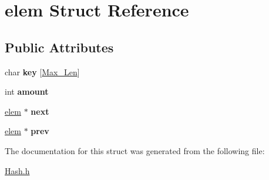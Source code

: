 \hypertarget{structelem}{\section{elem Struct Reference}
\label{structelem}
}
\subsection*{Public Attributes}
\begin{DoxyCompactItemize}
\item 
\hypertarget{structelem_a7f9840c852384016883d25531fb91973}{char {\bfseries key} \mbox{[}\hyperlink{Hash_8h_af086ed3f61750a30d9f6f5a397e0edc0}{Max\-\_\-\-Len}\mbox{]}}\label{structelem_a7f9840c852384016883d25531fb91973}

\item 
\hypertarget{structelem_a516926f6d3843f4c39d0c974786d5302}{int {\bfseries amount}}\label{structelem_a516926f6d3843f4c39d0c974786d5302}

\item 
\hypertarget{structelem_a13d0e216257db6754fbee2af9829170c}{\hyperlink{structelem}{elem} $\ast$ {\bfseries next}}\label{structelem_a13d0e216257db6754fbee2af9829170c}

\item 
\hypertarget{structelem_a9d914201f1b505801ec2c812ca6e8630}{\hyperlink{structelem}{elem} $\ast$ {\bfseries prev}}\label{structelem_a9d914201f1b505801ec2c812ca6e8630}

\end{DoxyCompactItemize}


The documentation for this struct was generated from the following file\-:\begin{DoxyCompactItemize}
\item 
\hyperlink{Hash_8h}{Hash.\-h}\end{DoxyCompactItemize}

